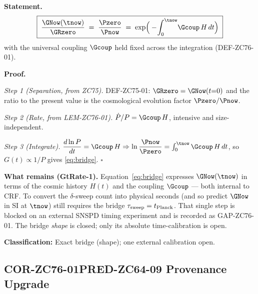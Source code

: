 \documentclass[12pt, a4paper]{article}
\begin{document}
\begin{formalbox}[title={THM-ZC76-01: Cosmological Bridge
  ($R_0{\to}R_{\max}$)}]

\textbf{Statement.}
\begin{equation}
  \boxed{\;\frac{\GNow(\tnow)}{\GRzero}
  \;=\; \frac{\Pzero}{\Pnow}
  \;=\; \exp\!\Big(-\!\int_0^{\tnow}\!\Gcoup\,H\,dt\Big)
  \;}
  \label{eq:bridge}
\end{equation}
with the universal coupling $\Gcoup$ held fixed across the integration
(DEF-ZC76-01).

\textbf{Proof.}

\textit{Step 1 (Separation, from ZC75).}
DEF-ZC75-01: $\GRzero = \GNow(t{=}0)$ and the ratio to the present value
is the cosmological evolution factor $\Pzero/\Pnow$.

\textit{Step 2 (Rate, from LEM-ZC76-01).}
$\dot{P}/P = \Gcoup\,H$, intensive and size-independent.

\textit{Step 3 (Integrate).}
$\dfrac{d\ln P}{dt} = \Gcoup\,H \Rightarrow
\ln\dfrac{\Pnow}{\Pzero} = \int_0^{\tnow}\Gcoup\,H\,dt$, so
$G(t)\propto 1/P$ gives \eqref{eq:bridge}.
\hfill$\square$

\textbf{What remains (GtRate-1).}
Equation~\eqref{eq:bridge} expresses $\GNow(\tnow)$ in terms of the
cosmic history $H(t)$ and the coupling $\Gcoup$ --- both internal to
CRF. To convert the $\delta$-sweep count into physical seconds (and so
predict $\GNow$ in SI at $\tnow$) still requires the bridge
$\tau_{\rm sweep} = t_{\rm Planck}$. That single step is blocked on an
external SNSPD timing experiment and is recorded as GAP-ZC76-01. The
bridge \emph{shape} is closed; only its absolute time-calibration is
open.

\textbf{Classification:} Exact bridge (shape); one external calibration
open.
\end{formalbox}

\subsection{COR-ZC76-01\quad PRED-ZC64-09 Provenance Upgrade}
\label{sec:cor01}

\end{document}
